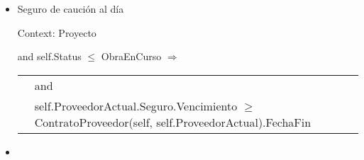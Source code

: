 \begin{itemize}
	\item Seguro de caución al día
	
			Context: Proyecto
			
			 and self.Status $\leq$ ObraEnCurso $\Rightarrow$
			
			\begin{tabular}{ll}
				\hfill
				& \notEmpty{self.ProveedorActual.Seguro} and	\\
				& self.ProveedorActual.Seguro.Vencimiento $\geq$ ContratoProveedor(self, self.ProveedorActual).FechaFin	\\
			\end{tabular}
				
	\item 
\end{itemize}
